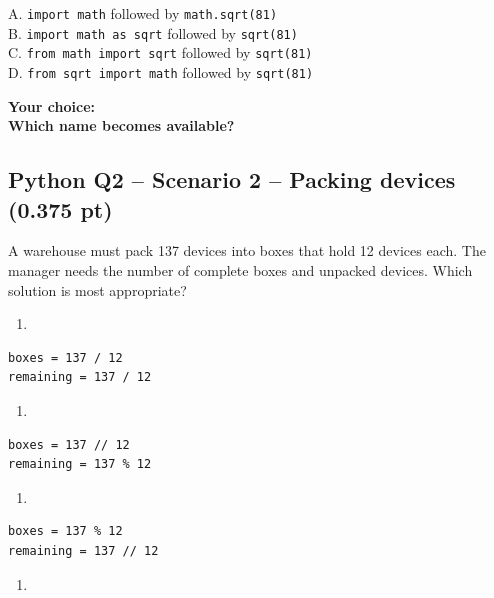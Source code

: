 \documentclass[10pt]{article}
\providecommand{\tightlist}{\setlength{\itemsep}{0pt}\setlength{\parskip}{0pt}}
\begin{document}
A. \texttt{import\ math} followed by \texttt{math.sqrt(81)}\\
B. \texttt{import\ math\ as\ sqrt} followed by \texttt{sqrt(81)}\\
C. \texttt{from\ math\ import\ sqrt} followed by \texttt{sqrt(81)}\\
D. \texttt{from\ sqrt\ import\ math} followed by \texttt{sqrt(81)}

\textbf{Your choice:}\\
\textbf{Which name becomes available?}


\subsection*{Python Q2 -- Scenario 2 -- Packing devices (0.375 pt)}
A warehouse must pack 137 devices into boxes that hold 12 devices each.
The manager needs the number of complete boxes and unpacked devices.
Which solution is most appropriate?

\begin{enumerate}
\def\labelenumi{\Alph{enumi}.}
\tightlist
\item
\end{enumerate}

\begin{verbatim}
boxes = 137 / 12
remaining = 137 / 12
\end{verbatim}

\begin{enumerate}
\def\labelenumi{\Alph{enumi}.}
\setcounter{enumi}{1}
\tightlist
\item
\end{enumerate}

\begin{verbatim}
boxes = 137 // 12
remaining = 137 % 12
\end{verbatim}

\begin{enumerate}
\def\labelenumi{\Alph{enumi}.}
\setcounter{enumi}{2}
\tightlist
\item
\end{enumerate}

\begin{verbatim}
boxes = 137 % 12
remaining = 137 // 12
\end{verbatim}

\begin{enumerate}
\def\labelenumi{\Alph{enumi}.}
\setcounter{enumi}{3}
\tightlist
\item
\end{enumerate}
\end{document}
